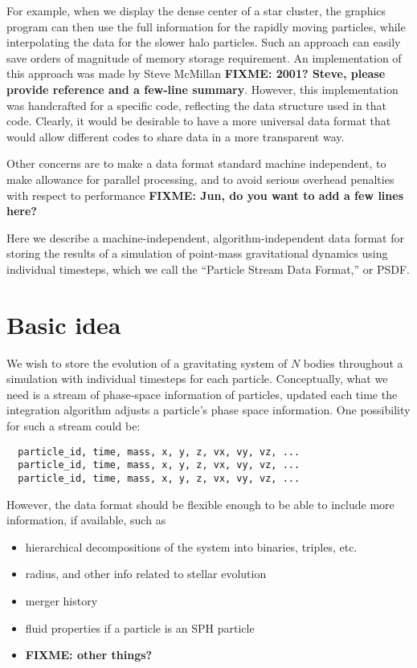 \documentclass[5p,authoryear]{elsarticle}
\newcommand{\fixme}[1]{\textbf{FIXME: #1}}
\begin{document}
For example, when we display the dense center of a star cluster, the
graphics program can then use the full information for the rapidly
moving particles, while interpolating the data for the slower halo
particles.  Such an approach can easily save orders of magnitude of
memory storage requirement.  An implementation of this approach was
made by Steve McMillan \fixme{2001?  Steve, please provide reference
  and a few-line summary}.  However, this implementation was
handcrafted for a specific code, reflecting the data structure used in
that code.  Clearly, it would be desirable to have a more universal
data format that would allow different codes to share data in a more
transparent way.

Other concerns are to make a data format standard machine independent,
to make allowance for parallel processing, and to avoid serious
overhead penalties with respect to performance \fixme{Jun, do you want
  to add a few lines here?}

Here we describe a machine-independent, algorithm-independent data
format for storing the results of a simulation of point-mass
gravitational dynamics using individual timesteps, which we call the
``Particle Stream Data Format,'' or PSDF.

\section{Basic idea}

We wish to store the evolution of a gravitating system of $N$ bodies
throughout a simulation with individual timesteps for each
particle. Conceptually, what we need is a stream of phase-space
information of particles, updated each time the integration algorithm
adjusts a particle's phase space information.  One possibility for
such a stream could be:
\begin{verbatim}
  particle_id, time, mass, x, y, z, vx, vy, vz, ...
  particle_id, time, mass, x, y, z, vx, vy, vz, ...
  particle_id, time, mass, x, y, z, vx, vy, vz, ...
\end{verbatim}
However, the data format should be flexible enough to be able to
include more information, if available, such as
\begin{itemize}
\item hierarchical decompositions of the system into binaries,
  triples, etc.
\item radius, and other info related to stellar evolution
\item merger history
\item fluid properties if a particle is an SPH particle
\item \fixme{other things?}
\end{itemize}
\end{document}
